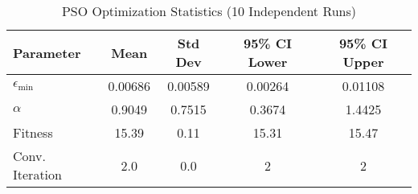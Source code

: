 \begin{table}[t]
\centering
\caption{PSO Optimization Statistics (10 Independent Runs)}
\label{tab:pso_statistics}
\begin{tabular}{lcccc}
\hline
Parameter & Mean & Std Dev & 95\% CI Lower & 95\% CI Upper \\
\hline
$\epsilon_{\min}$ & 0.00686 & 0.00589 & 0.00264 & 0.01108 \\
$\alpha$ & 0.9049 & 0.7515 & 0.3674 & 1.4425 \\
Fitness & 15.39 & 0.11 & 15.31 & 15.47 \\
Conv. Iteration & 2.0 & 0.0 & 2 & 2 \\
\hline
\end{tabular}
\end{table}